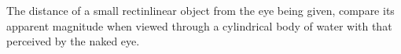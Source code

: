 The distance of a small rectinlinear object 
from the eye being given, compare its apparent
magnitude when viewed through a cylindrical
body of water with that perceived by the 
naked eye.
